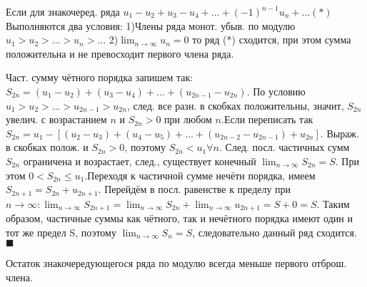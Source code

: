 \documentclass[unicode,10pt, landscape]{article}
\newenvironment{Proof} %
{\par\noindent{\bf Док-во:}} %
{\hfill$\scriptstyle\blacksquare$}
\begin{document}
\begin{multicols}{4}
\begin{Th}
Если для знакочеред.  ряда
$u_{1}-u_2+u_3-u_4+...+(-1)^{n-1}u_n+...(*)$
Выполняются два условия:
1)Члены ряда монот. убыв. по модулю $u_{1} > u_2 > ...> u_n > ...$
2)$\lim_{n \to \infty} u_n = 0$
то ряд (*) сходится, при этом сумма положительна и не превосходит первого члена ряда.
\begin{Proof}
Част. сумму чётного порядка запишем так: $S_{2n}=(u_{1}-u_2)+(u_3-u_4)+...+(u_{2n-1}-u_{2n})$.
По условию $u_{1} > u_2 > ...> u_{2n-1} > u_{2n}$, след. все разн. в скобках положительны, значит, $S_{2n}$ увелич. с возрастанием $n$  и $ S_{2n}>0$ при любом $n$.Если переписать так $S_{2n}=u_{1}-[(u_2-u_3)+(u_4-u_5)+...+(u_{2n-2}-u_{2n-1})+u_{2n}]$. Выраж. в скобках полож. и  $S_{2n}>0$, поэтому  $S_{2n}<u_1 \forall n$. След. посл. частичных сумм $S_{2n}$ ограничена и возрастает, след., существует конечный  $\lim_{n \to \infty}S_{2n}=S$. При этом $ 0<S_{2n}\leq u_1$.Переходя к частичной сумме нечётн порядка, имеем $S_{2n+1}=S_{2n}+u_{2n+1}$. Перейдём в посл. равенстве к пределу при $n \to \infty:\lim_{n \to \infty}S_{2n+1}=\lim_{n \to \infty}S_{2n}+\lim_{n \to \infty}u_{2n+1}=S+0=S$. Таким образом, частичные суммы как чётного, так и нечётного порядка имеют один и тот же предел S, поэтому $\lim_{n \to \infty}S_{n}=S$, следовательно данный ряд сходится.
\end{Proof}
\end{Th}
Остаток знакочередующегося ряда по модулю всегда меньше первого отброш. члена.



\end{multicols}
\end{document}
